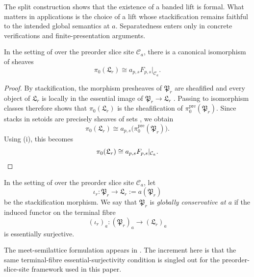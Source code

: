 \begin{remark}\label{rem:separatedness-needed}
The split construction shows that the existence of a banded lift is formal. What matters in applications is the choice of a lift whose stackification remains faithful to the intended global semantics at $a$. Separatedness enters only in concrete verifications and finite-presentation arguments.
\end{remark}

\begin{proposition}\label{prop:stackification-components}
In the setting of  over the preorder slice site $\mathcal C_a$, there is a canonical isomorphism of sheaves
\[
\pi_0(\mathfrak L_r)\cong a_{p,s}F_{p,s}|_{\mathcal C_a}.
\]
\end{proposition}

\begin{proof}
By stackification, the morphism presheaves of $\mathfrak P_r$ are sheafified and every object of $\mathfrak L_r$ is locally in the essential image of $\mathfrak P_r\to \mathfrak L_r$ \cite[Tag~02ZP]{StacksProject}. Passing to isomorphism classes therefore shows that $\pi_0(\mathfrak L_r)$ is the sheafification of $\pi_0^{\mathrm{pre}}(\mathfrak P_r)$. Since stacks in setoids are precisely sheaves of sets \cite[Tag~042Y]{StacksProject}, we obtain
\[
\pi_0(\mathfrak L_r)\cong a_{p,s}\bigl(\pi_0^{\mathrm{pre}}(\mathfrak P_r)\bigr).
\]
Using (i), this becomes
\[
\pi_0(\mathfrak L_r)\cong a_{p,s}F_{p,s}|_{\mathcal C_a}.
\qedhere
\]
\end{proof}

\begin{definition}\label{def:global-conservativity}
In the setting of  over the preorder slice site $\mathcal C_a$, let
\[
\iota_r:\mathfrak P_r\to \mathfrak L_r:=a(\mathfrak P_r)
\]
be the stackification morphism. We say that $\mathfrak P_r$ is \emph{globally conservative at $a$} if the induced functor on the terminal fibre
\[
(\iota_r)_a:(\mathfrak P_r)_a\to (\mathfrak L_r)_a
\]
is essentially surjective.
\end{definition}

\begin{remark}
The meet-semilattice formulation appears in \cite[Definition~4.13]{MaZhang2026ConditionalGluingFailure}. The increment here is that the same terminal-fibre essential-surjectivity condition is singled out for the preorder-slice-site framework used in this paper.
\end{remark}

